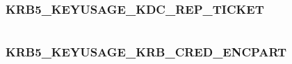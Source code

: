 \documentclass[letterpaper,10pt,english]{sphinxmanual}
\begin{document}
\begin{fulllineitems}
\label{appdev/refs/macros/KRB5_KEYUSAGE_IAKERB_FINISHED:KRB5_KEYUSAGE_IAKERB_FINISHED}
\end{fulllineitems}


\begin{tabulary}{\linewidth}{|L|L|}
\hline

 & 
\\
\hline\end{tabulary}



\subsubsection{KRB5\_KEYUSAGE\_KDC\_REP\_TICKET}
\label{appdev/refs/macros/KRB5_KEYUSAGE_KDC_REP_TICKET::doc}\label{appdev/refs/macros/KRB5_KEYUSAGE_KDC_REP_TICKET:krb5-keyusage-kdc-rep-ticket-data}\label{appdev/refs/macros/KRB5_KEYUSAGE_KDC_REP_TICKET:krb5-keyusage-kdc-rep-ticket}

\begin{fulllineitems}
\label{appdev/refs/macros/KRB5_KEYUSAGE_KDC_REP_TICKET:KRB5_KEYUSAGE_KDC_REP_TICKET}
\end{fulllineitems}


\begin{tabulary}{\linewidth}{|L|L|}
\hline

 & 
\\
\hline\end{tabulary}



\subsubsection{KRB5\_KEYUSAGE\_KRB\_CRED\_ENCPART}
\label{appdev/refs/macros/KRB5_KEYUSAGE_KRB_CRED_ENCPART:krb5-keyusage-krb-cred-encpart-data}\label{appdev/refs/macros/KRB5_KEYUSAGE_KRB_CRED_ENCPART::doc}\label{appdev/refs/macros/KRB5_KEYUSAGE_KRB_CRED_ENCPART:krb5-keyusage-krb-cred-encpart}

\begin{fulllineitems}
\label{appdev/refs/macros/KRB5_KEYUSAGE_KRB_CRED_ENCPART:KRB5_KEYUSAGE_KRB_CRED_ENCPART}
\end{fulllineitems}
\end{document}

